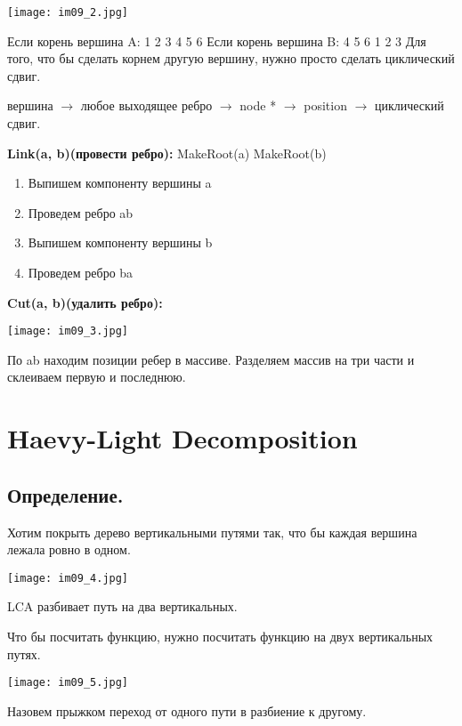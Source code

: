 \begin{center} 
\texttt{[image: im09\_2.jpg]} 
\end{center}

Если корень вершина A: 1 2 3 4 5 6
Если корень вершина B: 4 5 6 1 2 3 
Для того, что бы сделать корнем другую вершину, нужно просто сделать циклический сдвиг. 

вершина $\to$ любое выходящее ребро $\to$ node * $\to$ position $\to$ циклический сдвиг.

\textbf{Link(a, b)(провести ребро):}
    MakeRoot(a)
    MakeRoot(b)
    \begin{enumerate}
    \item Выпишем компоненту вершины a
    \item Проведем ребро ab 
    \item Выпишем компоненту вершины b
    \item Проведем ребро ba
    \end{enumerate}

\textbf{Cut(a, b)(удалить ребро):}
\begin{center} 
\texttt{[image: im09\_3.jpg]} 
\end{center}

По ab находим позиции ребер в массиве. Разделяем массив на три части и склеиваем первую и последнюю. 

\section{Haevy-Light Decomposition}
\subsection{Определение.}
Хотим покрыть дерево вертикальными путями так, что бы каждая вершина лежала ровно в одном.

\begin{center} 
\texttt{[image: im09\_4.jpg]} 
\end{center}

LCA разбивает путь на два вертикальных. 

Что бы посчитать функцию, нужно посчитать функцию на двух вертикальных путях. 

\begin{center} 
\texttt{[image: im09\_5.jpg]} 
\end{center}

\begin{Def}
Назовем прыжком переход от одного пути в разбиение к другому. 
\end{Def}

